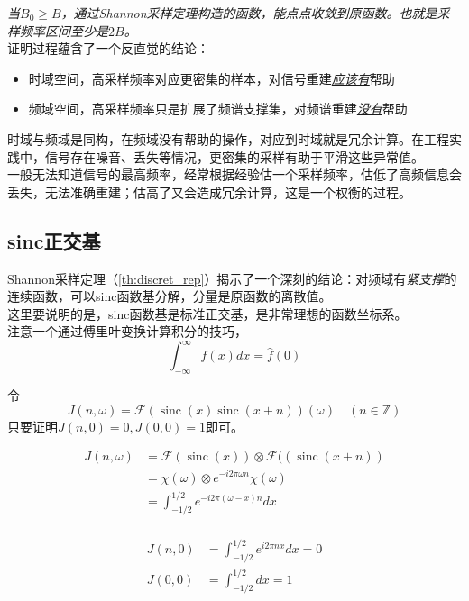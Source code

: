 	\textit{当$B_0\ge B$，通过Shannon采样定理构造的函数，能点点收敛到原函数。也就是采样频率区间至少是$2B$。}\\

	证明过程蕴含了一个反直觉的结论：

	\begin{itemize}
		\item 时域空间，高采样频率对应更密集的样本，对信号重建\underline{\textit{应该有}}帮助
		\item 频域空间，高采样频率只是扩展了频谱支撑集，对频谱重建\underline{\textit{没有}}帮助
	\end{itemize}
	
	时域与频域是同构，在频域没有帮助的操作，对应到时域就是冗余计算。在工程实践中，信号存在噪音、丢失等情况，更密集的采样有助于平滑这些异常值。\\

	一般无法知道信号的最高频率，经常根据经验估一个采样频率，估低了高频信息会丢失，无法准确重建；估高了又会造成冗余计算，这是一个权衡的过程。

\subsection{sinc正交基}
	
	Shannon采样定理（\ref{th:discret_rep}）揭示了一个深刻的结论：对频域有\textit{紧支撑}的连续函数，可以sinc函数基分解，分量是原函数的离散值。\\

	这里要说明的是，sinc函数基是标准正交基，是非常理想的函数坐标系。\\

	注意一个通过傅里叶变换计算积分的技巧，
	$$
		\int_{-\infty}^{\infty} f(x) dx = \hat{f}(0)
	$$

	令
	$$
		J(n,\omega) = \mathcal{F}(\mathop{sinc}(x)\mathop{sinc}(x+n)) (\omega)\quad (n\in \mathbb{Z})
	$$
	只要证明$J(n,0)=0,J(0,0) = 1$即可。

	\begin{align*}	
		J(n,\omega) &= \mathcal{F}(\mathop{sinc}(x)) \otimes \mathcal{F}((\mathop{sinc}(x+n)) \\
		& = \chi(\omega) \otimes e^{-i2\pi \omega n} \chi(\omega) \\
		& = \int_{-1/2}^{1/2} e^{-i2\pi (\omega -x) n} dx\\
	\end{align*}

	$$
		\begin{aligned}
				J(n,0)&= \int_{-1/2}^{1/2} e^{i2\pi nx } dx =0 \\
				J(0,0)&= \int_{-1/2}^{1/2} dx = 1		
		\end{aligned}
	$$

